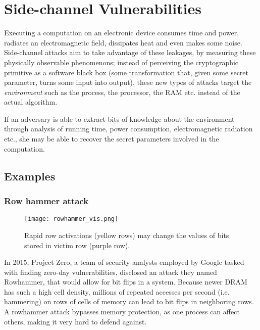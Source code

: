 \section{Side-channel Vulnerabilities}
Executing a computation on an electronic device consumes time and power, radiates an electromagnetic field, dissipates heat and even makes some noise\cite{Gnad_Krautter_Tahoori_2019}. 
Side-channel attacks aim to take advantage of these leakages, by measuring these physically observable phenomenons; instead of perceiving the cryptographic primitive as a software black box (some transformation that, given some secret parameter, turns some input into output), these new types of attacks target the \emph{environment} such as the process, the processor, the RAM etc. instead of the actual algorithm.

If an adversary is able to extract bits of knowledge about the environment through analysis of running time, power consumption, electromagnetic radiation etc., she may be able to recover the secret parameters involved in the computation.

\subsection{Examples}
\subsubsection{Row hammer attack}

\begin{figure}
  \begin{center}
    \texttt{[image: rowhammer\_vis.png]}
  \end{center}
  \caption{Rapid row activations (yellow rows) may change the values of bits stored in victim row (purple row).}
\end{figure}

In 2015, Project Zero, a team of security analysts employed by Google tasked with finding zero-day vulnerabilities, disclosed an attack they named Rowhammer, that would allow for bit flips in a system.
Because newer DRAM has such a high cell density, millions of repeated accesses per second (i.e. hammering) on rows of cells of memory can lead to bit flips in neighboring rows.
A rowhammer attack bypasses memory protection, as one process can affect others, making it very hard to defend against.

%

